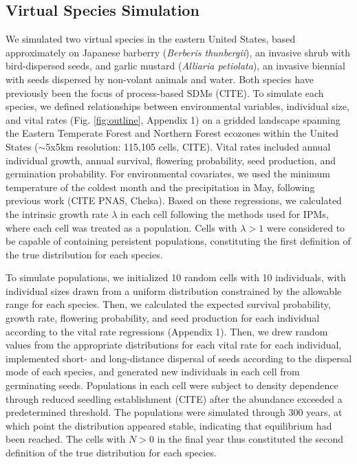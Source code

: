 \documentclass[preprint,review,times,12pt]{elsarticle}
\begin{document}
\subsection{Virtual Species Simulation}
We simulated two virtual species in the eastern United States, based approximately on Japanese barberry (\emph{Berberis thunbergii}), an invasive shrub with bird-dispersed seeds, and garlic mustard (\emph{Alliaria petiolata}), an invasive biennial with seeds dispersed by non-volant animals and water. Both species have previously been the focus of process-based SDMs (CITE). To simulate each species, we defined relationships between environmental variables, individual size, and vital rates (Fig. \ref{fig:outline}, Appendix 1) on a gridded landscape spanning the Eastern Temperate Forest and Northern Forest ecozones within the United States ($\sim$5x5km resolution: 115,105 cells, CITE). Vital rates included annual individual growth, annual survival, flowering probability, seed production, and germination probability. For environmental covariates, we used the minimum temperature of the coldest month and the precipitation in May, following previous work (CITE PNAS, Chelsa). Based on these regressions, we calculated the intrinsic growth rate $\lambda$ in each cell following the methods used for IPMs, where each cell was treated as a population. Cells with $\lambda > 1$ were considered to be capable of containing persistent populations, constituting the first definition of the true distribution for each species.

To simulate populations, we initialized 10 random cells with 10 individuals, with individual sizes drawn from a uniform distribution constrained by the allowable range for each species. Then, we calculated the expected survival probability, growth rate, flowering probability, and seed production for each individual according to the vital rate regressions (Appendix 1). Then, we drew random values from the appropriate distributions for each vital rate for each individual, implemented short- and long-distance dispersal of seeds according to the dispersal mode of each species, and generated new individuals in each cell from germinating seeds. Populations in each cell were subject to density dependence through reduced seedling establishment (CITE) after the abundance exceeded a predetermined threshold. The populations were simulated through 300 years, at which point the distribution appeared stable, indicating that equilibrium had been reached. The cells with $N > 0$ in the final year thus constituted the second definition of the true distribution for each species.
\end{document}
